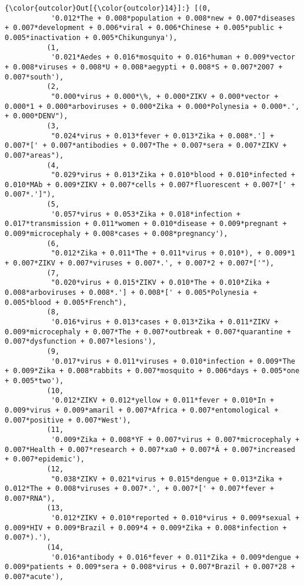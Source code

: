 \documentclass[11pt]{article}
\begin{document}
            \begin{Verbatim}[commandchars=\\\{\}]
{\color{outcolor}Out[{\color{outcolor}14}]:} [(0,
           '0.012*The + 0.008*population + 0.008*new + 0.007*diseases + 0.007*development + 0.006*viral + 0.006*Chinese + 0.005*public + 0.005*inactivation + 0.005*Chikungunya'),
          (1,
           '0.021*Aedes + 0.016*mosquito + 0.016*human + 0.009*vector + 0.008*viruses + 0.008*U + 0.008*aegypti + 0.008*S + 0.007*2007 + 0.007*south'),
          (2,
           "0.000*virus + 0.000*\%, + 0.000*ZIKV + 0.000*vector + 0.000*1 + 0.000*arboviruses + 0.000*Zika + 0.000*Polynesia + 0.000*.', + 0.000*DENV"),
          (3,
           "0.024*virus + 0.013*fever + 0.013*Zika + 0.008*.'] + 0.007*[' + 0.007*antibodies + 0.007*The + 0.007*sera + 0.007*ZIKV + 0.007*areas"),
          (4,
           "0.029*virus + 0.013*Zika + 0.010*blood + 0.010*infected + 0.010*MAb + 0.009*ZIKV + 0.007*cells + 0.007*fluorescent + 0.007*[' + 0.007*.']"),
          (5,
           '0.057*virus + 0.053*Zika + 0.018*infection + 0.017*transmission + 0.011*women + 0.010*disease + 0.009*pregnant + 0.009*microcephaly + 0.008*cases + 0.008*pregnancy'),
          (6,
           "0.012*Zika + 0.011*The + 0.011*virus + 0.010*), + 0.009*1 + 0.007*ZIKV + 0.007*viruses + 0.007*.', + 0.007*2 + 0.007*['"),
          (7,
           "0.020*virus + 0.015*ZIKV + 0.010*The + 0.010*Zika + 0.008*arboviruses + 0.008*.'] + 0.008*[' + 0.005*Polynesia + 0.005*blood + 0.005*French"),
          (8,
           '0.016*virus + 0.013*cases + 0.013*Zika + 0.011*ZIKV + 0.009*microcephaly + 0.007*The + 0.007*outbreak + 0.007*quarantine + 0.007*dysfunction + 0.007*lesions'),
          (9,
           '0.017*virus + 0.011*viruses + 0.010*infection + 0.009*The + 0.009*Zika + 0.008*rabbits + 0.007*mosquito + 0.006*days + 0.005*one + 0.005*two'),
          (10,
           '0.012*ZIKV + 0.012*yellow + 0.011*fever + 0.010*In + 0.009*virus + 0.009*amaril + 0.007*Africa + 0.007*entomological + 0.007*positive + 0.007*West'),
          (11,
           '0.009*Zika + 0.008*YF + 0.007*virus + 0.007*microcephaly + 0.007*Health + 0.007*research + 0.007*xa0 + 0.007*Â + 0.007*increased + 0.007*epidemic'),
          (12,
           "0.038*ZIKV + 0.021*virus + 0.015*dengue + 0.013*Zika + 0.012*The + 0.008*viruses + 0.007*.', + 0.007*[' + 0.007*fever + 0.007*RNA"),
          (13,
           '0.012*ZIKV + 0.010*reported + 0.010*virus + 0.009*sexual + 0.009*HIV + 0.009*Brazil + 0.009*4 + 0.009*Zika + 0.008*infection + 0.007*).'),
          (14,
           '0.016*antibody + 0.016*fever + 0.011*Zika + 0.009*dengue + 0.009*patients + 0.009*sera + 0.008*virus + 0.007*Brazil + 0.007*28 + 0.007*acute'),

\end{Verbatim}
\end{document}
